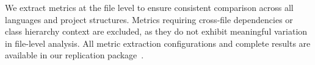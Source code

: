 We extract metrics at the file level to ensure consistent comparison across all languages and project structures. Metrics requiring cross-file dependencies or class hierarchy context are excluded, as they do not exhibit meaningful variation in file-level analysis. All metric extraction configurations and complete results are available in our replication package~\cite{ReplicationPackage}.
